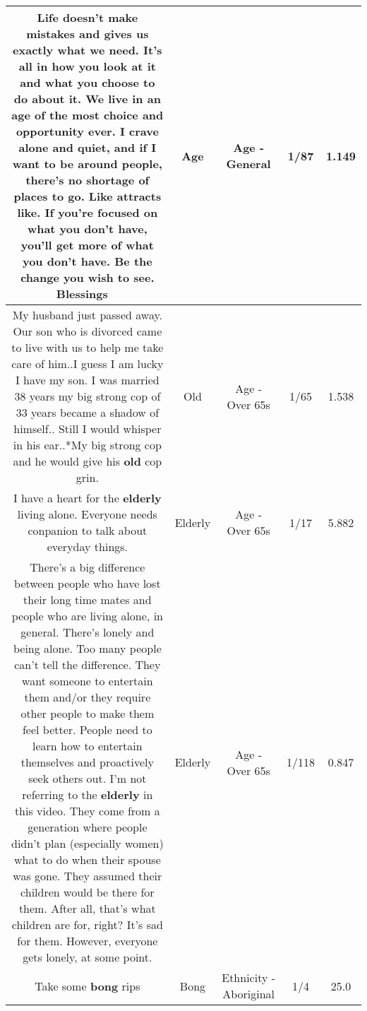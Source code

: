 \documentclass[11pt]{article}
\newlength\mylength
\begin{document}
\begin{center}
\begin{longtable}{|C{.65\mylength}|C{.30\mylength}|C{.12\mylength}|C{.12\mylength}|C{.12\mylength}|}
  \small Life doesn't make mistakes and gives us exactly what we need.  It's all in how you look at it and what you choose to do about it.  We live in an \textbf{age} of the most choice and opportunity ever.  I crave alone and quiet, and if I want to be around people, there's no shortage of places to go.  Like attracts like.  If you're focused on what you don't have, you'll get more of what you don't have.  Be the change you wish to see.  Blessings 🧚‍♀️\normalsize   & Age & Age - General & 1/87 & 1.149 \\  \hline
  \small My husband just passed away. Our son who is divorced came to live with us to help me take care of him..I guess I am lucky I have my son. I was married 38 years my big strong cop of 33 years became a shadow of himself.. Still I would whisper in his ear..*My big strong cop and he would give his \textbf{old} cop grin.\normalsize   & Old & Age - Over 65s & 1/65 & 1.538 \\  \hline
  \small I have a heart for the \textbf{elderly} living alone. Everyone needs conpanion to talk about everyday things.\normalsize   & Elderly & Age - Over 65s & 1/17 & 5.882 \\  \hline
  \small There's a big difference between people who have lost their long time mates and people who are living alone, in general.  There's lonely and being alone.  Too many people can't tell the difference.  They want someone to entertain them and/or they require other people to make them feel better.  People need to learn how to entertain themselves and proactively seek others out.  I'm not referring to the \textbf{elderly} in this video.  They come from a generation where people didn't plan (especially women) what to do when their spouse was gone.  They assumed their children would be there for them.  After all, that's what children are for, right? It's sad for them.  However, everyone gets lonely, at some point.\normalsize   & Elderly & Age - Over 65s & 1/118 & 0.847 \\  \hline
  \small Take some \textbf{bong} rips\normalsize   & Bong & Ethnicity - Aboriginal & 1/4 & 25.0 \\  \hline

\end{longtable}
\end{center}
\end{document}
